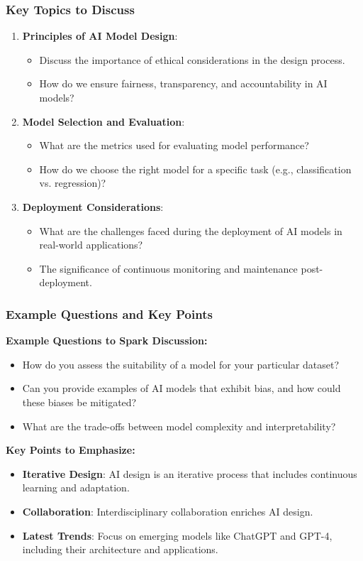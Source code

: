 \documentclass[aspectratio=169]{beamer}
\begin{document}
\begin{frame}[fragile]
    \frametitle{Key Topics to Discuss}
    \begin{enumerate}
        \item \textbf{Principles of AI Model Design}:
        \begin{itemize}
            \item Discuss the importance of ethical considerations in the design process.
            \item How do we ensure fairness, transparency, and accountability in AI models?
        \end{itemize}

        \item \textbf{Model Selection and Evaluation}:
        \begin{itemize}
            \item What are the metrics used for evaluating model performance?
            \item How do we choose the right model for a specific task (e.g., classification vs. regression)?
        \end{itemize}

        \item \textbf{Deployment Considerations}:
        \begin{itemize}
            \item What are the challenges faced during the deployment of AI models in real-world applications?
            \item The significance of continuous monitoring and maintenance post-deployment.
        \end{itemize}
    \end{enumerate}
\end{frame}

\begin{frame}[fragile]
    \frametitle{Example Questions and Key Points}
    \textbf{Example Questions to Spark Discussion:}
    \begin{itemize}
        \item How do you assess the suitability of a model for your particular dataset?
        \item Can you provide examples of AI models that exhibit bias, and how could these biases be mitigated?
        \item What are the trade-offs between model complexity and interpretability?
    \end{itemize}

    \textbf{Key Points to Emphasize:}
    \begin{itemize}
        \item \textbf{Iterative Design}: AI design is an iterative process that includes continuous learning and adaptation.
        \item \textbf{Collaboration}: Interdisciplinary collaboration enriches AI design.
        \item \textbf{Latest Trends}: Focus on emerging models like ChatGPT and GPT-4, including their architecture and applications.
    \end{itemize}
\end{frame}
\end{document}
